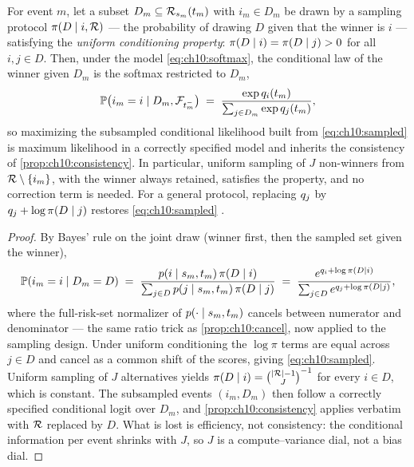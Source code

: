 \begin{theorem}\label{thm:ch10:sampled}
For event $m$, let a subset $D_m \subseteq \mathcal{R}_{s_m}(t_m)$ with
$i_m \in D_m$ be drawn by a sampling protocol $\pi(D \mid i, \mathcal{R})$
--- the probability of drawing $D$ given that the winner is $i$ ---
satisfying the \emph{uniform conditioning property}: $\pi(D \mid i) =
\pi(D \mid j) > 0$ for all $i, j \in D$. Then, under the model
\cref{eq:ch10:softmax}, the conditional law of the winner given $D_m$ is
the softmax restricted to $D_m$,
\begin{equation}\label{eq:ch10:sampled}
\mathbb{P}\big(i_m = i \mid D_m, \mathcal{F}_{t_m^-}\big)
 \;=\;
 \frac{\exp q_i(t_m)}{\sum_{j \in D_m} \exp q_j(t_m)},
\end{equation}
so maximizing the subsampled conditional likelihood built from
\cref{eq:ch10:sampled} is maximum likelihood in a correctly specified
model and inherits the consistency of \cref{prop:ch10:consistency}. In
particular, uniform sampling of $J$ non-winners from
$\mathcal{R} \setminus \{i_m\}$, with the winner always retained, satisfies
the property, and no correction term is needed. For a general protocol,
replacing $q_j$ by $q_j + \log \pi(D \mid j)$ restores
\cref{eq:ch10:sampled} \citep{mcfadden1978,train2009}.
\end{theorem}

\begin{proof}
By Bayes' rule on the joint draw (winner first, then the sampled set
given the winner),
\[
\mathbb{P}(i_m = i \mid D_m = D)
 \;=\;
 \frac{p(i \mid s_m, t_m)\, \pi(D \mid i)}
      {\sum_{j \in D} p(j \mid s_m, t_m)\, \pi(D \mid j)}
 \;=\;
 \frac{e^{q_i + \log \pi(D \mid i)}}
      {\sum_{j \in D} e^{q_j + \log \pi(D \mid j)}},
\]
where the full-risk-set normalizer of $p(\cdot \mid s_m, t_m)$ cancels
between numerator and denominator --- the same ratio trick as
\cref{prop:ch10:cancel}, now applied to the sampling design. Under
uniform conditioning the $\log \pi$ terms are equal across $j \in D$ and
cancel as a common shift of the scores, giving \cref{eq:ch10:sampled}.
Uniform sampling of $J$ alternatives yields $\pi(D \mid i) =
\binom{|\mathcal{R}| - 1}{J}^{-1}$ for every $i \in D$, which is constant.
The subsampled events $(i_m, D_m)$ then follow a correctly specified
conditional logit over $D_m$, and \cref{prop:ch10:consistency} applies
verbatim with $\mathcal{R}$ replaced by $D$. What is lost is efficiency, not
consistency: the conditional information per event shrinks with $J$, so
$J$ is a compute--variance dial, not a bias dial.
\end{proof}

